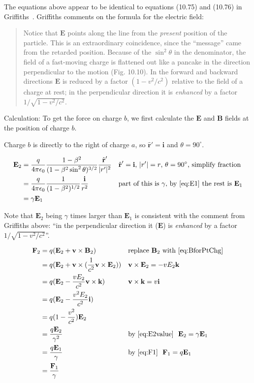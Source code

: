 \documentclass[a4paper]{article}
\theoremstyle{plain}
\theoremstyle{definition}
\newcommand{\ihat}{\textbf{i}}
\newcommand{\khat}{\textbf{k}}
\newcommand{\rhat}{\hat{\textbf{r}}}
\newcommand{\vect}[1]{\textbf{#1}}
\begin{document}
The equations above appear to be identical to equations (10.75) and
(10.76) in Griffiths~\cite{Griffiths1998}.  Griffiths comments on the formula for the electric field:

\begin{quote}
Notice that $\vect{E}$ points along the line from the {\em present}
position of the particle.  This is an extraordinary coincidence, since
the ``message'' came from the retarded position.  Because of the
$\sin^2 \theta$ in the denominator, the field of a fast-moving charge
is flattened out like a pancake in the direction perpendicular to the
motion (Fig. 10.10).  In the forward and backward directions
$\vect{E}$ is reduced by a factor $(1 - v^2/c^2)$ relative to the
field of a charge at rest; in the perpendicular direction it is
{\em enhanced} by a factor $1 / \sqrt{ 1 - v^2/c^2}$.
\end{quote}

Calculation: To get the force on charge $b$, we first calculate the
$\vect{E}$ and $\vect{B}$ fields at the position of charge $b$.

Charge $b$ is directly to the right of charge $a$, so ${\rhat}' = \ihat$
and $\theta = 90^{\circ}$.

\begin{align}
\vect{E}_2
  & = \frac{q}{4 \pi \epsilon_0} \frac{1-\beta^2}{(1-\beta^2 \sin^2 \theta)^{3/2}} \frac{{\rhat}'}{|r'|^2} & & \text{${\rhat}' = \ihat$, $|r'| = r$, $\theta=90^{\circ}$, simplify fraction} \nonumber \\
  & = \frac{q}{4 \pi \epsilon_0} \frac{1}{(1-\beta^2)^{1/2}} \frac{\ihat}{r^2} & & \text{part of this is $\gamma$, by~\eqref{eq:E1} the rest is $\vect{E}_1$} \nonumber \\
  & = \gamma \vect{E}_1 \label{eq:E2value}
\end{align}

Note that $\vect{E}_2$ being $\gamma$ times larger than $\vect{E}_1$
is consistent with the comment from Griffiths above: ``in the
perpendicular direction it ($\vect{E}$) is {\em enhanced} by a factor
$1 / \sqrt{ 1 - v^2/c^2}$''.

\begin{align*}
\vect{F}_2
  & = q (\vect{E}_2 + \vect{v} \times \vect{B}_2)   & & \text{replace $\vect{B}_2$ with \eqref{eq:BforPtChg}} \\
  & = q (\vect{E}_2 + \vect{v} \times (\frac{1}{c^2} \vect{v} \times \vect{E}_2))  & & \vect{v} \times \vect{E}_2 = - v E_2 \khat \\
  & = q (\vect{E}_2 - \frac{v E_2}{c^2} \vect{v} \times \khat)  & & \vect{v} \times \khat = v \ihat \\
  & = q (\vect{E}_2 - \frac{v^2 E_2}{c^2} \ihat) \\
  & = q (1 - \frac{v^2}{c^2}) \vect{E}_2 \\
  & = \frac{q \vect{E}_2}{\gamma^2} & & \text{by~\eqref{eq:E2value} \ } \vect{E}_2 = \gamma \vect{E}_1 \\
  & = \frac{q \vect{E}_1}{\gamma} & & \text{by~\eqref{eq:F1} \ } \vect{F}_1 = q \vect{E}_1 \\
  & = \frac{\vect{F}_1}{\gamma}
\end{align*}
\end{document}

